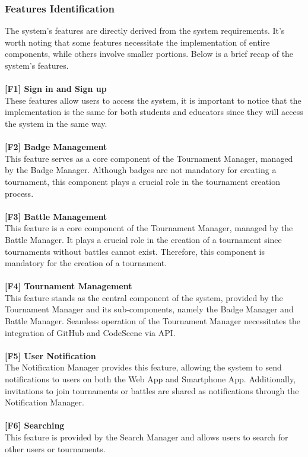 \documentclass{article}
\begin{document}
\subsubsection{Features Identification}
The system's features are directly derived from the system requirements. It's worth noting that some features necessitate the implementation of entire components, while others involve smaller portions. Below is a brief recap of the system's features. \\\\
\textbf{[F1] Sign in and Sign up} \\
These features allow users to access the system, it is important to notice that the implementation is the same for both students and educators since they will access the system in the same way. \\\\
\textbf{[F2] Badge Management} \\
This feature serves as a core component of the Tournament Manager, managed by the Badge Manager. Although badges are not mandatory for creating a tournament, this component plays a crucial role in the tournament creation process. \\\\
\textbf{[F3] Battle Management} \\
This feature is a core component of the Tournament Manager, managed by the Battle Manager. It plays a crucial role in the creation of a tournament since tournaments without battles cannot exist. Therefore, this component is mandatory for the creation of a tournament. \\\\
\textbf{[F4] Tournament Management} \\
This feature stands as the central component of the system, provided by the Tournament Manager and its sub-components, namely the Badge Manager and Battle Manager. Seamless operation of the Tournament Manager necessitates the integration of GitHub and CodeScene via API. \\\\
\textbf{[F5] User Notification} \\
The Notification Manager provides this feature, allowing the system to send notifications to users on both the Web App and Smartphone App. Additionally, invitations to join tournaments or battles are shared as notifications through the Notification Manager. \\\\
\textbf{[F6] Searching} \\
This feature is provided by the Search Manager and allows users to search for other users or tournaments.
\end{document}

